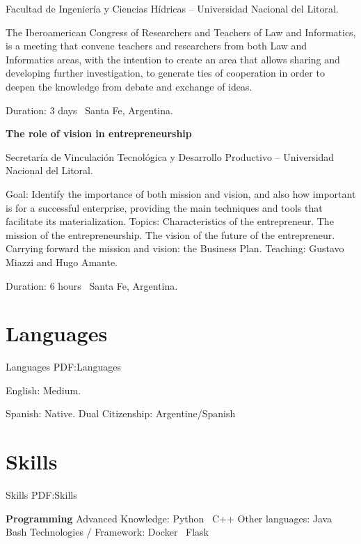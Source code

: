 \documentclass[letterpaper,MMMyyyy,nonstop]{simpleresumecv}
\begin{document}
\begin{body}
\BulletItem Facultad de Ingeniería y Ciencias Hídricas – Universidad Nacional del Litoral.
\begin{detail}
	\SubBulletItem
	The Iberoamerican Congress of Researchers and Teachers of Law and Informatics, is a meeting that convene teachers and researchers from both Law and Informatics areas, with the intention to create an area that allows sharing and developing further investigation, to generate ties of cooperation in order to deepen the knowledge from debate and exchange of ideas.
\end{detail}
Duration: 3 days \SubBulletSymbol\, Santa Fe, Argentina.

\BigGap
\textbf{The role of vision in entrepreneurship}
\hfill
{}

\BulletItem Secretaría de Vinculación Tecnológica y Desarrollo Productivo – Universidad Nacional del Litoral.
\begin{detail}
	\SubBulletItem
	Goal: Identify the importance of both mission and vision, and also how important is for a successful enterprise, providing the main techniques and tools that facilitate its materialization.
	\SubBulletItem
	Topics: Characteristics of the entrepreneur. The mission of the entrepreneurship. The vision of the future of the entrepreneur. Carrying forward the mission and vision: the Business Plan.
	\SubBulletItem
	Teaching: Gustavo Miazzi and Hugo Amante. 
\end{detail}
Duration: 6 hours \SubBulletSymbol\, Santa Fe, Argentina.


\section
{Languages}
{Languages}
{PDF:Languages}

\BulletItem
English: Medium.

\GapNoBreak
\BulletItem
Spanish: Native.
\GapNoBreak
\BulletItem
Dual Citizenship: Argentine/Spanish


\section
{Skills}
{Skills}
{PDF:Skills}

\textbf{Programming}
\BulletItem
Advanced Knowledge: Python \SubBulletSymbol\, C++
\BulletItem
Other languages: Java \SubBulletSymbol\, Bash
\BulletItem
Technologies / Framework: Docker \SubBulletSymbol\, Flask


\end{body}
\end{document}
